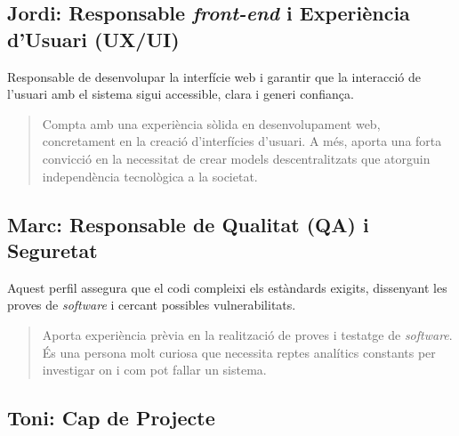 \subsection{Jordi: Responsable \textit{front-end} i Experiència d'Usuari (UX/UI)}

Responsable de desenvolupar la interfície web i garantir que la interacció de l'usuari amb el sistema sigui accessible, clara i generi confiança.

\begin{quote}
    Compta amb una experiència sòlida en desenvolupament web, concretament en la creació d'interfícies d'usuari. A més, aporta una forta convicció en la necessitat de crear models descentralitzats que atorguin independència tecnològica a la societat.
\end{quote}


\subsection{Marc: Responsable de Qualitat (QA) i Seguretat}

Aquest perfil assegura que el codi compleixi els estàndards exigits, dissenyant les proves de \textit{software} i cercant possibles vulnerabilitats.

\begin{quote}
    Aporta experiència prèvia en la realització de proves i testatge de \textit{software}. És una persona molt curiosa que necessita reptes analítics constants per investigar on i com pot fallar un sistema.
\end{quote}


\subsection{Toni: Cap de Projecte}


